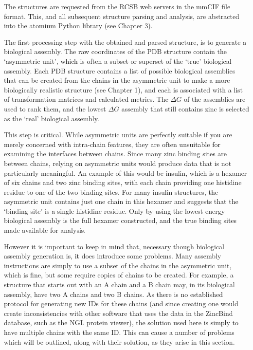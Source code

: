 The structures are requested from the RCSB web servers in the mmCIF file format. This, and all subsequent structure parsing and analysis, are abstracted into the atomium Python library (see Chapter 3).

The first processing step with the obtained and parsed structure, is to generate a biological assembly. The raw coordinates of the PDB structure contain the `asymmetric unit', which is often a subset or superset of the `true' biological assembly. Each PDB structure contains a list of possible biological assemblies that can be created from the chains in the asymmetric unit to make a more biologically realistic structure (see Chapter 1), and each is associated with a list of transformation matrices and calculated metrics. The $\Delta G$ of the assemblies are used to rank them, and the lowest $\Delta G$ assembly that still contains zinc is selected as the `real' biological assembly.

This step is critical. While asymmetric units are perfectly suitable if you are merely concerned with intra-chain features, they are often unsuitable for examining the interfaces between chains. Since many zinc binding sites are between chains, relying on asymmetric units would produce data that is not particularly meaningful. An example of this would be insulin, which is a hexamer of six chains and two zinc binding sites, with each chain providing one histidine residue to one of the two binding sites. For many insulin structures, the asymmetric unit contains just one chain in this hexamer and suggests that the `binding site' is a single histidine residue. Only by using the lowest energy biological assembly is the full hexamer constructed, and the true binding sites made available for analysis.

However it is important to keep in mind that, necessary though biological assembly generation is, it does introduce some problems. Many assembly instructions are simply to use a subset of the chains in the asymmetric unit, which is fine, but some require copies of chains to be created. For example, a structure that starts out with an A chain and a B chain may, in its biological assembly, have two A chains and two B chains. As there is no established protocol for generating new IDs for these chains (and since creating one would create inconsistencies with other software that uses the data in the ZincBind database, such as the NGL protein viewer), the solution used here is simply to have multiple chains with the same ID. This can cause a number of problems which will be outlined, along with their solution, as they arise in this section.

